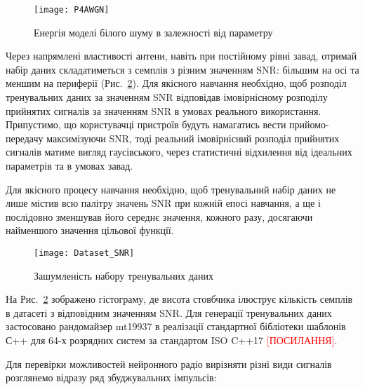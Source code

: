 \begin{figure}[htbp] \begin{center}
\texttt{[image: P4AWGN]}
\caption{Енергія моделі білого шуму в залежності від параметру} \label{fig:P4AWGN}
\end{center} \end{figure}

Через напрямлені властивості антени, навіть при постійному рівні завад, отримай 
набір даних складатиметься з семплів з різним значенням SNR: більшим на осі та
меншим на периферії (Рис.~\ref{fig:SNR}). Для якісного навчання необхідно, 
щоб розподіл тренувальних даних за значенням SNR відповідав імовірнісному 
розподілу прийнятих сигналів за значенням SNR в умовах реального використання.
Припустимо, що користувачці пристроїв будуть намагатись вести прийомо-передачу
максимізуючи SNR, тоді реальний імовірнісний розподіл прийнятих сигналів матиме 
вигляд гаусівського, через статистичні відхилення від ідеальних параметрів та 
в умовах завад.

Для якісного процесу навчання необхідно, щоб тренувальний набір даних не 
лише містив всю палітру значень SNR при кожній епосі навчання, а ще і 
послідовно зменшував його середнє значення, кожного разу, досягаючи 
найменшого значення цільової функції.

\begin{figure}[htbp] \begin{center}
\texttt{[image: Dataset\_SNR]}
\caption{Зашумленість набору тренувальних даних} \label{fig:SNR}
\end{center} \end{figure}

На Рис.~\ref{fig:SNR} зображено гістограму, де висота стовбчика ілюструє 
кількість семплів в датасеті з відповідним значенням SNR. Для генерації 
тренувальних даних застосовано рандомайзер mt19937 в реалізації стандартної
бібліотеки шаблонів С++ для 64-х розрядних систем за стандартом ISO C++17
\textcolor{red}{[ПОСИЛАННЯ]}.

Для перевірки можливостей нейронного радіо вирізняти різні види сигналів 
розглянемо відразу ряд збуджувальних імпульсів:

